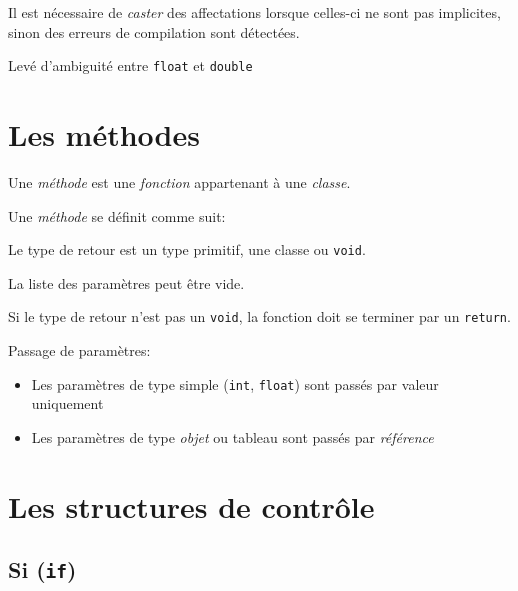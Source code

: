 			\begin{definition}
				Il est nécessaire de \emph{caster} des affectations lorsque celles-ci ne sont pas implicites, sinon des erreurs de compilation sont détectées.
				
			\end{definition}
		
		\begin{remarque}
			Levé d'ambiguité entre \lstinline|float| et \lstinline|double|
			
		\end{remarque}
		
		\section{Les méthodes}
		
			\begin{definition}
				Une \emph{méthode} est une \emph{fonction} appartenant à une \emph{classe}.
			\end{definition}
			Une \emph{méthode} se définit comme suit:
			
			
			\begin{remarque}
				Le type de retour est un type primitif, une classe ou \lstinline|void|.
			\end{remarque}
			\begin{remarque}
				La liste des paramètres peut être vide.
			\end{remarque}
			\begin{remarque}
				Si le type de retour n'est pas un \lstinline|void|, la fonction doit se terminer par un \lstinline|return|.
			\end{remarque}
	
			Passage de paramètres:
				\begin{itemize}
					\item Les paramètres de type simple (\lstinline|int|, \lstinline|float|) sont passés par valeur uniquement
					\item Les paramètres de type \emph{objet} ou tableau sont passés par \emph{référence}
				\end{itemize}
		
		\section{Les structures de contrôle}
		
			\subsection{Si (\lstinline{if})} \label{if}
			
